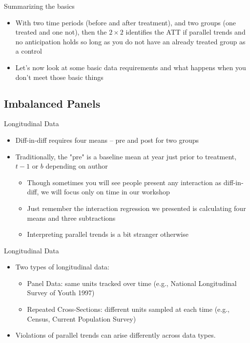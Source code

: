 \documentclass{beamer}
\begin{document}
\begin{frame}{Summarizing the basics}

\begin{itemize}
\item With two time periods (before and after treatment), and two groups (one treated and one not), then the $2 \times 2$ identifies the ATT if parallel trends and no anticipation holds so long as you do not have an already treated group as a control
\item Let's now look at some basic data requirements and what happens when you don't meet those basic things

\end{itemize}

\end{frame}

\subsection{Imbalanced Panels}

\begin{frame}{Longitudinal Data}

\begin{itemize}

\item Diff-in-diff requires four means -- pre and post for two groups
\item Traditionally, the "pre" is a baseline mean at year just prior to treatment, $t-1$ or $b$ depending on author
	\begin{itemize}
	\item Though sometimes you will see people present any interaction as diff-in-diff, we will focus only on time in our workshop
	\item Just remember the interaction regression we presented is calculating four means and three subtractions
	\item Interpreting parallel trends is a bit stranger otherwise
	\end{itemize}
\end{itemize}

\end{frame}

\begin{frame}{Longitudinal Data}

\begin{itemize}

\item Two types of longitudinal data:
    \begin{itemize}
      \item Panel Data: same units tracked over time (e.g., National Longitudinal Survey of Youth 1997)
      \item Repeated Cross-Sections: different units sampled at each time (e.g., Census, Current Population Survey)
    \end{itemize}
    \item Violations of parallel trends can arise differently across data types.
\end{itemize}

\end{frame}
\end{document}
